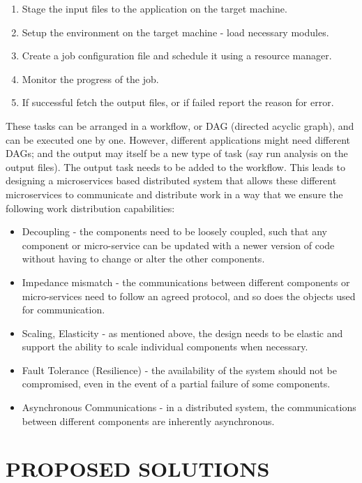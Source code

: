 \documentclass[sigconf]{acmart}
\begin{document}
\begin{enumerate}
\item Stage the input files to the application on the target machine.
\item Setup the environment on the target machine - load necessary modules.
\item Create a job configuration file and schedule it using a resource manager.
\item Monitor the progress of the job.
\item If successful fetch the output files, or if failed report the reason for error.
\end{enumerate}

These tasks can be arranged in a workflow, or DAG (directed acyclic graph), and can be executed one by one. However,  different applications might need different DAGs; and the output may itself be a new type of task (say run analysis on the output files).  The output task needs to be added to the workflow. This leads to designing a microservices based distributed system that allows these different microservices to communicate and distribute work in a way that we ensure the following work distribution capabilities:

\begin{itemize}
\item Decoupling - the components need to be loosely coupled, such that any component or micro-service can be updated with a newer version of code without having to change or alter the other components.
\item Impedance mismatch - the communications between different components or micro-services need to follow an agreed protocol, and so does the objects used for communication. 
\item Scaling, Elasticity - as mentioned above, the design needs to be elastic and support the ability to scale individual components when necessary.
\item Fault Tolerance (Resilience) - the availability of the system should not be compromised, even in the event of a partial failure of some components. 
\item Asynchronous Communications - in a distributed system, the communications between different components are inherently asynchronous. 
\end{itemize}	

\section{PROPOSED SOLUTIONS}
\end{document}
